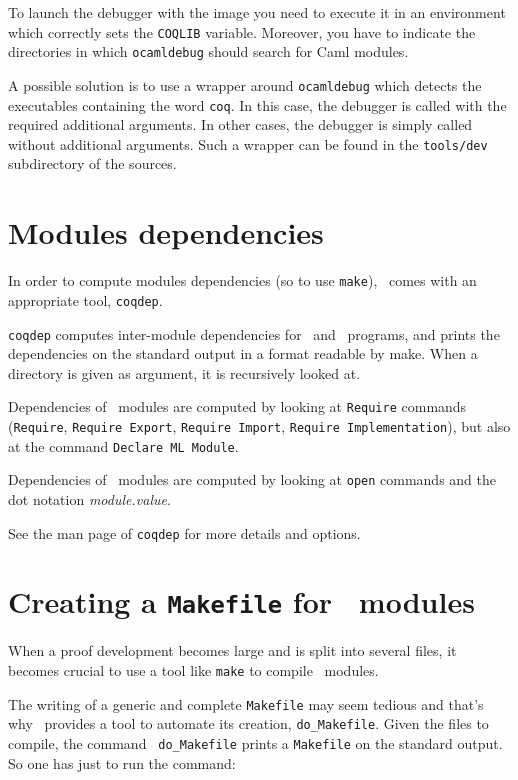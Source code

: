 To launch the \ocaml debugger with the image you need to execute it in
an environment which correctly sets the \texttt{COQLIB} variable.
Moreover, you have to indicate the directories in which
\texttt{ocamldebug} should search for Caml modules.

A possible solution is to use a wrapper around \texttt{ocamldebug}
which detects the executables containing the word \texttt{coq}. In
this case, the debugger is called with the required additional
arguments. In other cases, the debugger is simply called without additional
arguments. Such a wrapper can be found in the \texttt{tools/dev}
subdirectory of the sources. 

\section{Modules dependencies}\label{Dependencies}

In order to compute modules dependencies (so to use {\tt make}),
\Coq\ comes with an appropriate tool, {\tt coqdep}.

{\tt coqdep} computes inter-module dependencies for \Coq\ and
\ocaml\ programs, and prints the dependencies on the standard
output in a format readable by make.  When a directory is given as
argument, it is recursively looked at.

Dependencies of \Coq\ modules are computed by looking at {\tt Require}
commands ({\tt Require}, {\tt Requi\-re Export}, {\tt Require Import},
{\tt Require Implementation}), but also at the command {\tt Declare ML Module}.

Dependencies of \ocaml\ modules are computed by looking at
\verb!open! commands and the dot notation {\em module.value}.

See the man page of {\tt coqdep} for more details and options.


\section{Creating a {\tt Makefile} for \Coq\ modules}
\label{Makefile}

When a proof development becomes large and is split into several files,
it becomes crucial to use a tool like {\tt make} to compile \Coq\
modules.

The writing of a generic and complete {\tt Makefile} may seem tedious
and that's why \Coq\ provides a tool to automate its creation,
{\tt do\_Makefile}. Given the files to compile, the command {\tt
do\_Makefile} prints a 
{\tt Makefile} on the standard output. So one has just to run the
command:

